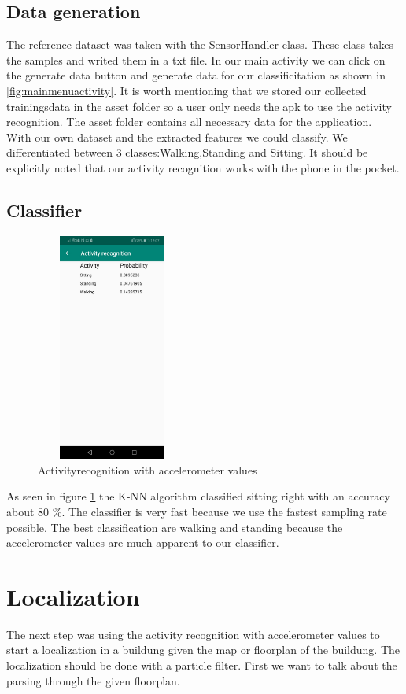 \documentclass[conference]{IEEEtran}
\begin{document}
\subsection{Data generation}
The reference dataset was  taken with the SensorHandler class. These class takes the samples and writed them in a txt file. In our main activity we can click on the generate data button and generate data for our classificitation as shown in \ref{fig:mainmenuactivity}. It is worth mentioning that we stored our collected trainingsdata in the asset folder so a user only needs the apk to use the activity recognition. The asset folder contains all necessary data for the application.\\ 
With our own dataset and the extracted features we could classify. We differentiated between 3 classes:Walking,Standing and Sitting. It should be explicitly noted that our activity recognition works with the phone in the pocket. 
\subsection{Classifier}
\begin{figure}
\includegraphics[height = 7.5cm,width = 5cm]{Images/AcitivityRecognition.jpeg}
\centering
\caption{Activityrecognition with accelerometer values }
\label{fig:classifier}
\end{figure}
As seen in figure \ref{fig:classifier} the K-NN algorithm classified sitting right with an accuracy about 80 \%. The classifier is very fast because we use the fastest sampling rate possible. The best classification are walking and standing because the accelerometer values are much apparent to our classifier.

\section{Localization}
The next step was using the activity recognition with accelerometer values to start a localization in a buildung given the map or floorplan of the buildung. The localization should be done with a particle filter. First we want to talk about the parsing through the given floorplan.
\end{document}
